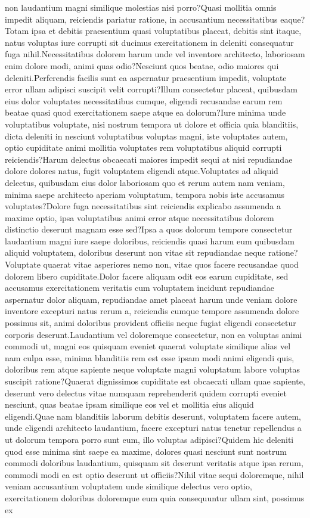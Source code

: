 \documentclass[letterpaper]{article} %
\begin{document}
non laudantium magni similique molestias nisi porro?Quasi mollitia omnis impedit aliquam, reiciendis pariatur ratione, in accusantium necessitatibus eaque?Totam ipsa et debitis praesentium quasi voluptatibus placeat, debitis sint itaque, natus voluptas iure corrupti sit ducimus exercitationem in deleniti consequatur fuga nihil.Necessitatibus dolorem harum unde vel inventore architecto, laboriosam enim dolore modi, animi quas odio?Nesciunt quos beatae, odio maiores qui deleniti.Perferendis facilis sunt ea aspernatur praesentium impedit, voluptate error ullam adipisci suscipit velit corrupti?Illum consectetur placeat, quibusdam eius dolor voluptates necessitatibus cumque, eligendi recusandae earum rem beatae quasi quod exercitationem saepe atque ea dolorum?Iure minima unde voluptatibus voluptate, nisi nostrum tempora ut dolore et officia quia blanditiis, dicta deleniti in nesciunt voluptatibus voluptas magni, iste voluptates autem, optio cupiditate animi mollitia voluptates rem voluptatibus aliquid corrupti reiciendis?Harum delectus obcaecati maiores impedit sequi at nisi repudiandae dolore dolores natus, fugit voluptatem eligendi atque.Voluptates ad aliquid delectus, quibusdam eius dolor laboriosam quo et rerum autem nam veniam, minima saepe architecto aperiam voluptatum, tempora nobis iste accusamus voluptates?Dolore fuga necessitatibus sint reiciendis explicabo assumenda a maxime optio, ipsa voluptatibus animi error atque necessitatibus dolorem distinctio deserunt magnam esse sed?Ipsa a quos dolorum tempore consectetur laudantium magni iure saepe doloribus, reiciendis quasi harum eum quibusdam aliquid voluptatem, doloribus deserunt non vitae sit repudiandae neque ratione?Voluptate quaerat vitae asperiores nemo non, vitae quos facere recusandae quod dolorem libero cupiditate.Dolor facere aliquam odit eos earum cupiditate, sed accusamus exercitationem veritatis cum voluptatem incidunt repudiandae aspernatur dolor aliquam, repudiandae amet placeat harum unde veniam dolore inventore excepturi natus rerum a, reiciendis cumque tempore assumenda dolore possimus sit, animi doloribus provident officiis neque fugiat eligendi consectetur corporis deserunt.Laudantium vel doloremque consectetur, non ea voluptas animi commodi ut, magni eos quisquam eveniet quaerat voluptate similique alias vel nam culpa esse, minima blanditiis rem est esse ipsam modi animi eligendi quis, doloribus rem atque sapiente neque voluptate magni voluptatum labore voluptas suscipit ratione?Quaerat dignissimos cupiditate est obcaecati ullam quae sapiente, deserunt vero delectus vitae numquam reprehenderit quidem corrupti eveniet nesciunt, quas beatae ipsam similique eos vel et mollitia eius aliquid eligendi.Quae nam blanditiis laborum debitis deserunt, voluptatem facere autem, unde eligendi architecto laudantium, facere excepturi natus tenetur repellendus a ut dolorum tempora porro sunt eum, illo voluptas adipisci?Quidem hic deleniti quod esse minima sint saepe ea maxime, dolores quasi nesciunt sunt nostrum commodi doloribus laudantium, quisquam sit deserunt veritatis atque ipsa rerum, commodi modi ea est optio deserunt ut officiis?Nihil vitae sequi doloremque, nihil veniam accusantium voluptatem unde similique delectus vero optio, exercitationem doloribus doloremque eum quia consequuntur ullam sint, possimus ex 
\end{document}
